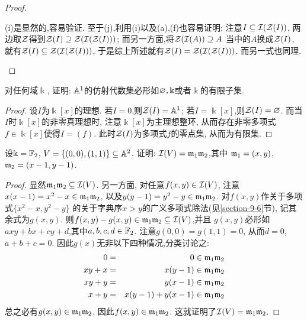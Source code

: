 \documentclass[oneside,a4papar,11pt,UTF8]{book}
\begin{document}
\begin{enumerate}
\begin{proof}
\begin{itemize}
      (i)是显然的,容易验证.
      至于(j),利用(i)以及(a),(f)也容易证明:
      注意$I\subseteq \mathcal{I}(\mathcal{Z}(I))$,
      两边取$\mathcal{Z}$得到$\mathcal{Z}(I)\supseteq\mathcal{Z}(\mathcal{I}(\mathcal{Z}(I)))$;
      而另一方面,将$\mathcal{Z}(\mathcal{I}(A))\supseteq A$
      当中的$A$换成$\mathcal{Z}(I)$,
      就有$\mathcal{Z}(I)\subseteq\mathcal{Z}(\mathcal{I}(\mathcal{Z}(I)))$,
      于是综上所述就有$\mathcal{Z}(I)=\mathcal{Z}(\mathcal{I}(\mathcal{Z}(I)))$.
      而另一式也同理.
    \end{itemize}
  \end{proof}

  \begin{prob}\label{ex-15-1-14}
    对任何域$\Bbbk$,
    证明: $\mathbb{A}^1$的仿射代数集必形如$\varnothing,\Bbbk$或者$\Bbbk$的有限子集.
  \end{prob}

  \begin{proof}
    设$I$为$\Bbbk[x]$的理想.
    若$I=0$,则$\mathcal{Z}(I)=\mathbb{A}^1$;
    若$I=\Bbbk[x]$,则$\mathcal{Z}(I)=\varnothing$.
    而当$I$时$\Bbbk[x]$的非零真理想时,
    注意$\Bbbk[x]$为主理想整环,
    从而存在非零多项式$f\in\Bbbk[x]$使得$I=(f)$.
    此时$\mathcal{Z}(I)$为多项式$f$的零点集,
    从而为有限集.
  \end{proof}

  \begin{prob}\label{ex-15-1-15}
    设$\Bbbk=\mathbb{F}_2$,
    $V=\{(0,0),(1,1)\}\subseteq\mathbb{A}^2$.
    证明: $\mathcal{I}(V)=\mathfrak{m}_1\mathfrak{m}_2$,其中
    $\mathfrak{m}_1=(x,y)$, $\mathfrak{m}_2=(x-1,y-1)$.
  \end{prob}

  \begin{proof}
    显然$\mathfrak{m}_1\mathfrak{m}_2\subseteq\mathcal{I}(V)$.
    另一方面,
    对任意$f(x,y)\in\mathcal{I}(V)$,
    注意$x(x-1)=x^2-x\in\mathfrak{m}_1\mathfrak{m}_2$,
    以及$y(y-1)=y^2-y\in\mathfrak{m}_1\mathfrak{m}_2$.
    对$f(x,y)$作关于多项式$\{x^2-x,y^2-y\}$
    的关于字典序$x>y$的广义多项式除法(见\ref{section-9-6}节),
    记其余式为$g(x,y)$.
    则$f(x,y)-g(x,y)\in\mathfrak{m}_1\mathfrak{m}_2\subseteq\mathcal{I}(V)$,并且
    $g(x,y)$必形如$axy+bx+cy+d$,其中$a,b,c,d\in\mathbb{F}_2$.
    注意$g(0,0)=g(1,1)=0$,
    从而$d=0$, $a+b+c=0$.
    因此$g(x)$无非以下四种情况,分类讨论之:
    \begin{eqnarray*}
      0    &=& 0\in\mathfrak{m}_1\mathfrak{m}_2\\
      xy+x &=& x(y-1)\in\mathfrak{m}_1\mathfrak{m}_2\\
      xy+y &=& y(x-1)\in\mathfrak{m}_1\mathfrak{m}_2\\
      x+y  &=& x(y-1)+y(x-1)\in\mathfrak{m}_1\mathfrak{m}_2
    \end{eqnarray*}
    总之必有$g(x,y)\in\mathfrak{m}_1\mathfrak{m}_2$.
    因此$f(x,y)\in\mathfrak{m}_1\mathfrak{m}_2$.
    这就证明了$\mathcal{I}(V)=\mathfrak{m}_1\mathfrak{m}_2$.
  \end{proof}


\end{enumerate}
\end{document}
